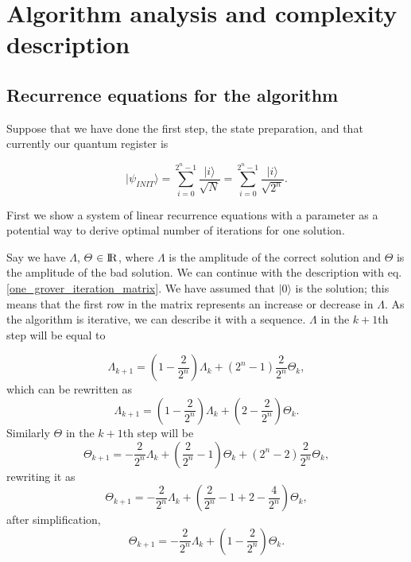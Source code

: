 \section{Algorithm analysis and complexity description}

\subsection{Recurrence equations for the algorithm} \label{Recurrence_eq_grover}
Suppose that we have done the first step, the state preparation, and that currently our quantum register is 

\begin{equation}
    |\psi_{INIT}\rangle =  \sum_{i=0}^{2^n-1} \frac{|i\rangle }{\sqrt{N}} =\sum_{i=0}^{2^n-1}\frac{|i\rangle }{\sqrt{2^n}}.
\end{equation}

First we show a system of linear recurrence equations with a parameter as a potential way to derive optimal number of iterations for one solution.

Say we have $\Lambda$, $\Theta$ $\in {\rm I\!R}$, where $\Lambda$ is the amplitude of the correct solution and $\Theta$ is the amplitude of the bad solution. We can continue with the description with eq. \ref{one_grover_iteration_matrix}. We have assumed that $|0\rangle$ is the solution; this means that the first row in the matrix represents an increase or decrease in $\Lambda$. As the algorithm is iterative, we can describe it with a sequence. $\Lambda$ in the $k+1$th step will be equal to

\begin{equation} \label{lambda_increment_first}
    \Lambda_{k+1} = (1-\frac{2}{2^n})\Lambda_k + (2^n -1)\frac{2}{2^n}\Theta_k,
\end{equation}
which can be rewritten as
\begin{equation}
    \Lambda_{k+1}= (1-\frac{2}{2^n})\Lambda_k + (2 - \frac{2}{2^n})\Theta_k.
\end{equation}
Similarly $\Theta$ in the $k+1$th step will be
\begin{equation}
    \Theta_{k+1} = -\frac{2}{2^n}\Lambda_k +(\frac{2}{2^n}-1)\Theta_k +(2^n -2)\frac{2}{2^n}\Theta_k,
\end{equation}
rewriting it as
    \begin{equation}
    \Theta_{k+1} = -\frac{2}{2^n}\Lambda_k +(\frac{2}{2^n}-1 +2 -\frac{4}{2^n})\Theta_k,
    \end{equation}
after simplification,
\begin{equation}
    \Theta_{k+1} = -\frac{2}{2^n}\Lambda_k +(1 -\frac{2}{2^n})\Theta_k.
\end{equation}


